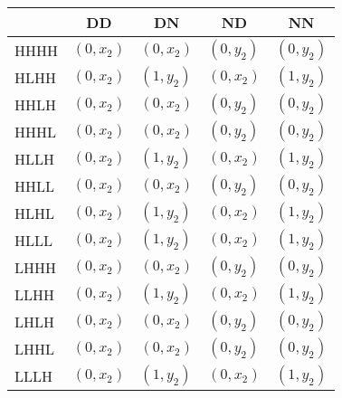 \begin{tabular}{lrrrr}
\toprule
      & \multicolumn{1}{c}{DD} & \multicolumn{1}{c}{DN} & \multicolumn{1}{c}{ND} & \multicolumn{1}{c}{NN} \\
\midrule
HHHH  & \multicolumn{1}{l}{$( 0 , x_2 )$} & \multicolumn{1}{l}{$( 0 , x_2 )$} & \multicolumn{1}{l}{$( 0 , y_2 )$} & \multicolumn{1}{l}{$( 0 , y_2 )$} \\
HLHH  & \multicolumn{1}{l}{$( 0 , x_2 )$} & \multicolumn{1}{l}{$( 1 , y_2 )$} & \multicolumn{1}{l}{$( 0 , x_2 )$} & \multicolumn{1}{l}{$( 1 , y_2 )$} \\
HHLH  & \multicolumn{1}{l}{$( 0 , x_2 )$} & \multicolumn{1}{l}{$( 0 , x_2 )$} & \multicolumn{1}{l}{$( 0 , y_2 )$} & \multicolumn{1}{l}{$( 0 , y_2 )$} \\
HHHL  & \multicolumn{1}{l}{$( 0 , x_2 )$} & \multicolumn{1}{l}{$( 0 , x_2 )$} & \multicolumn{1}{l}{$( 0 , y_2 )$} & \multicolumn{1}{l}{$( 0 , y_2 )$} \\
HLLH  & \multicolumn{1}{l}{$( 0 , x_2 )$} & \multicolumn{1}{l}{$( 1 , y_2 )$} & \multicolumn{1}{l}{$( 0 , x_2 )$} & \multicolumn{1}{l}{$( 1 , y_2 )$} \\
HHLL  & \multicolumn{1}{l}{$( 0 , x_2 )$} & \multicolumn{1}{l}{$( 0 , x_2 )$} & \multicolumn{1}{l}{$( 0 , y_2 )$} & \multicolumn{1}{l}{$( 0 , y_2 )$} \\
HLHL  & \multicolumn{1}{l}{$( 0 , x_2 )$} & \multicolumn{1}{l}{$( 1 , y_2 )$} & \multicolumn{1}{l}{$( 0 , x_2 )$} & \multicolumn{1}{l}{$( 1 , y_2 )$} \\
HLLL  & \multicolumn{1}{l}{$( 0 , x_2 )$} & \multicolumn{1}{l}{$( 1 , y_2 )$} & \multicolumn{1}{l}{$( 0 , x_2 )$} & \multicolumn{1}{l}{$( 1 , y_2 )$} \\
LHHH  & \multicolumn{1}{l}{$( 0 , x_2 )$} & \multicolumn{1}{l}{$( 0 , x_2 )$} & \multicolumn{1}{l}{$( 0 , y_2 )$} & \multicolumn{1}{l}{$( 0 , y_2 )$} \\
LLHH  & \multicolumn{1}{l}{$( 0 , x_2 )$} & \multicolumn{1}{l}{$( 1 , y_2 )$} & \multicolumn{1}{l}{$( 0 , x_2 )$} & \multicolumn{1}{l}{$( 1 , y_2 )$} \\
LHLH  & \multicolumn{1}{l}{$( 0 , x_2 )$} & \multicolumn{1}{l}{$( 0 , x_2 )$} & \multicolumn{1}{l}{$( 0 , y_2 )$} & \multicolumn{1}{l}{$( 0 , y_2 )$} \\
LHHL  & \multicolumn{1}{l}{$( 0 , x_2 )$} & \multicolumn{1}{l}{$( 0 , x_2 )$} & \multicolumn{1}{l}{$( 0 , y_2 )$} & \multicolumn{1}{l}{$( 0 , y_2 )$} \\
LLLH  & \multicolumn{1}{l}{$( 0 , x_2 )$} & \multicolumn{1}{l}{$( 1 , y_2 )$} & \multicolumn{1}{l}{$( 0 , x_2 )$} & \multicolumn{1}{l}{$( 1 , y_2 )$} \\

\end{tabular}
